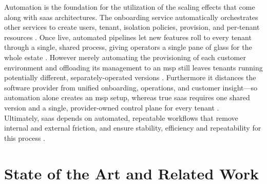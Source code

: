 \documentclass[11pt, a4paper, oneside, listof=totoc]{scrartcl}
\begin{document}
            Automation is the foundation for the utilization of the scaling effects that come along
            with \gls{saas} architectures.
            The onboarding service automatically orchestrates other services to
            create users, tenant, isolation policies, provision, and per-tenant resources
            \parencite[p.~14]{awsSaaSArchitectureFundamentals}.
            Once live, automated pipelines let new features roll to every tenant through a single,
            shared process, giving operators a single pane of glass for the whole estate
            \parencite[p.~10]{awsSaaSArchitectureFundamentals}.
            However merely automating the provisioning of each customer environment and offloading
            its management to an \gls{msp} still leaves tenants running potentially different,
            separately-operated versions \parencite[pp.~23--24]{awsSaaSArchitectureFundamentals}.
            Furthermore it distances the software provider from unified onboarding, operations, and
            customer insight—so automation alone creates an \gls{msp} setup, whereas true \gls{saas}
            requires one shared version and a single, provider-owned control plane for every tenant
            \parencite[pp.~23--24]{awsSaaSArchitectureFundamentals}.
            \\
            Ultimately, \gls{saas} depends on automated, repeatable workflows that remove internal
            and external friction, and ensure stability, efficiency and repeatability for this
            process \parencite[p.~14]{awsSaaSArchitectureFundamentals}.

    \section{State of the Art and Related Work}\label{sec:related}
\end{document}
